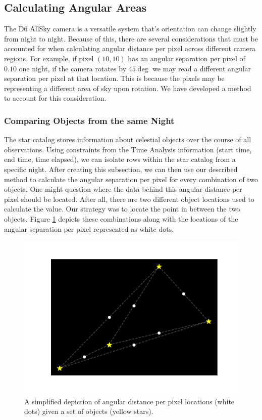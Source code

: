 \subsection{Calculating Angular Areas}

The D6 AllSky camera is a versatile system that's orientation can change slightly from night to night.
Because of this, there are several considerations that must be accounted for when calculating angular distance per pixel across different camera regions.
For example, if pixel $(10,10)$ has an angular separation per pixel of $0.10$ one night, if the camera rotates by $45 \deg$ we may read a different angular separation per pixel at that location.
This is because the pixels may be representing a different area of sky upon rotation.
We have developed a method to account for this consideration.

\subsubsection{Comparing Objects from the same Night}

The star catalog stores information about celestial objects over the course of all observations.
Using constraints from the Time Analysis information (start time, end time, time elapsed), we can isolate rows within the star catalog from a specific night.  
After creating this subsection, we can then use our described method to calculate the angular separation per pixel for every combination of two objects.
One might question where the data behind this angular distance per pixel should be located.
After all, there are two different object locations used to calculate the value.
Our strategy was to locate the point in between the two objects.  
Figure \ref{starcombos} depicts these combinations along with the locations of the angular separation per pixel represented as white dots.

\begin{figure}[ht!]
  \centering
  \includegraphics[scale=0.70]{images/star_combinations.png}
  \caption{A simplified depiction of angular distance per pixel locations (white dots) given a set of objects (yellow stars).}
  \label{starcombos}
\end{figure}

